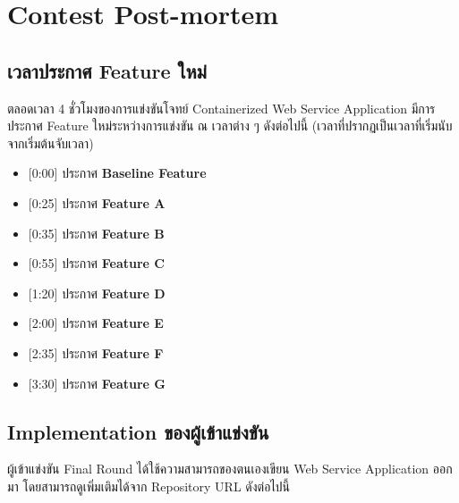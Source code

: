 
\section{Contest Post-mortem}

\subsection{เวลาประกาศ Feature ใหม่}

\noindent
ตลอดเวลา 4 ชั่วโมงของการแข่งขันโจทย์ Containerized Web Service Application มีการประกาศ Feature ใหม่ระหว่างการแข่งขัน ณ เวลาต่าง ๆ ดังต่อไปนี้ (เวลาที่ปรากฏเป็นเวลาที่เริ่มนับจากเริ่มต้นจับเวลา)

\begin{itemize}[parsep=0pc]
    \item{} [0:00] ประกาศ \textbf{Baseline Feature}
    \item{} [0:25] ประกาศ \textbf{Feature A}
    \item{} [0:35] ประกาศ \textbf{Feature B}
    \item{} [0:55] ประกาศ \textbf{Feature C}
    \item{} [1:20] ประกาศ \textbf{Feature D}
    \item{} [2:00] ประกาศ \textbf{Feature E}
    \item{} [2:35] ประกาศ \textbf{Feature F}
    \item{} [3:30] ประกาศ \textbf{Feature G}
\end{itemize}

\subsection{Implementation ของผู้เข้าแข่งขัน}

\noindent
ผู้เข้าแข่งขัน Final Round ได้ใช้ความสามารถของตนเองเขียน Web Service Application ออกมา โดยสามารถดูเพิ่มเติมได้จาก Repository URL ดังต่อไปนี้

